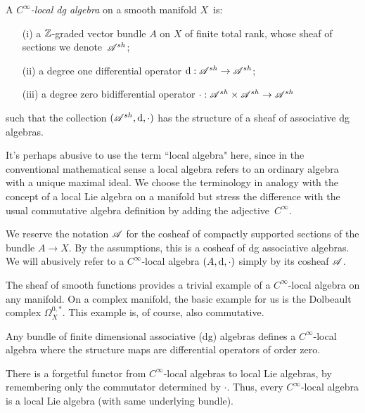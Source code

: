 \begin{dfn}\label{def: localalg}
A {\em $C^\infty$-local dg algebra} on a smooth manifold $X$~is:
\begin{enumerate}
\item[(i)] a $\mathbb Z$-graded vector bundle $A$ on $X$ of finite total rank, whose sheaf of sections we denote~$\mathscr A^{sh}$;
\item[(ii)] a degree one differential operator ${\rm d} : \mathscr A^{sh} \to \mathscr A^{sh}$;
\item[(iii)] a degree zero bidifferential operator $\cdot : \mathscr A^{sh} \times \mathscr A^{sh} \to \mathscr A^{sh}$
\end{enumerate}
such that the collection $(\mathscr A^{sh}, {\rm d}, \cdot)$ has the structure of a sheaf of associative dg algebras.
\end{dfn}

\begin{rmk}
It's perhaps abusive to use the term ``local algebra" here, since in the conventional mathematical sense a local algebra refers to an ordinary algebra with a unique maximal ideal. 
We choose the terminology in analogy with the concept of a local Lie algebra on a manifold but stress the difference with the usual commutative algebra definition by adding the adjective~$C^\infty$. 
\end{rmk}

We reserve the notation $\mathscr A$ for the cosheaf of compactly supported sections of the bundle $A \to X$.
By the assumptions, this is a cosheaf of dg associative algebras. 
We will abusively refer to a $C^\infty$-local algebra $(A, {\rm d}, \cdot)$ simply by its cosheaf $\mathscr A$.

\begin{eg}
The sheaf of smooth functions provides a trivial example of a $C^\infty$-local algebra on any manifold. 
On a complex manifold, the basic example for us is the Dolbeault complex $\Omega^{0,*}_X$.
This example is, of course, also commutative. 
\end{eg}

Any bundle of finite dimensional associative (dg) algebras defines a $C^\infty$-local algebra where the structure maps are differential operators of order zero. 


There is a forgetful functor from $C^\infty$-local algebras to local Lie algebras, by remembering only the commutator determined by $\cdot$. 
Thus, every $C^\infty$-local algebra is a local Lie algebra (with same underlying bundle). 

